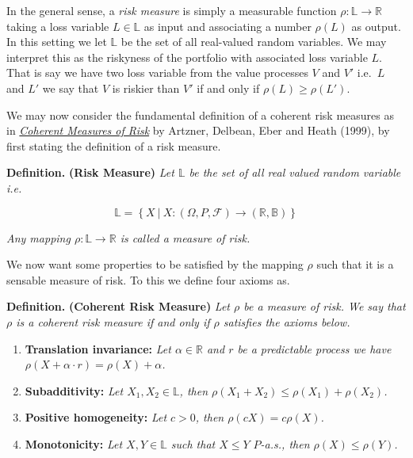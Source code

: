 \documentclass[
]{book}
\providecommand{\tightlist}{%
  \setlength{\itemsep}{0pt}\setlength{\parskip}{0pt}}
\begin{document}
In the general sense, a \emph{risk measure} is simply a measurable function \(\rho : \mathbb{L} \to\mathbb{R}\) taking a loss variable \(L\in \mathbb{L}\) as input and associating a number \(\rho(L)\) as output. In this setting we let \(\mathbb{L}\) be the set of all real-valued random variables. We may interpret this as the riskyness of the portfolio with associated loss variable \(L\). That is say we have two loss variable from the value processes \(V\) and \(V'\) i.e.~\(L\) and \(L'\) we say that \(V\) is riskier than \(V'\) if and only if \(\rho(L)\ge \rho(L')\).

We may now consider the fundamental definition of a coherent risk measures as in \href{https://www.researchgate.net/publication/227614132_Coherent_Measures_of_Risk}{\emph{Coherent Measures of Risk}} by Artzner, Delbean, Eber and Heath (1999), by first stating the definition of a risk measure.

\textbf{Definition.} \textbf{(Risk Measure)} \emph{Let \(\mathbb{L}\) be the set of all real valued random variable i.e.}

\[
\mathbb{L}=\left\{X\ \vert \ X : (\Omega,P,\mathcal{F})\to (\mathbb{R},\mathbb{B})\right\}
\]

\emph{Any mapping \(\rho : \mathbb{L} \to\mathbb{R}\) is called a measure of risk.}

We now want some properties to be satisfied by the mapping \(\rho\) such that it is a sensable measure of risk. To this we define four axioms as.

\textbf{Definition.} \textbf{(Coherent Risk Measure)} \emph{Let \(\rho\) be a measure of risk. We say that \(\rho\) is a coherent risk measure if and only if \(\rho\) satisfies the axioms below.}

\begin{enumerate}
\def\labelenumi{\arabic{enumi}.}
\tightlist
\item
  \textbf{Translation invariance:} \emph{Let \(\alpha\in\mathbb{R}\) and \(r\) be a predictable process we have \(\rho(X+\alpha\cdot r)=\rho(X)+\alpha\).}
\item
  \textbf{Subadditivity:} \emph{Let \(X_1,X_2\in\mathbb{L}\), then \(\rho(X_1+X_2)\le \rho(X_1)+\rho(X_2)\).}
\item
  \textbf{Positive homogeneity:} \emph{Let \(c>0\), then \(\rho(cX)=c\rho(X)\).}
\item
  \textbf{Monotonicity:} \emph{Let \(X,Y\in\mathbb{L}\) such that \(X\le Y\) \(P\)-a.s., then \(\rho(X)\le \rho(Y)\).}
\end{enumerate}
\end{document}
